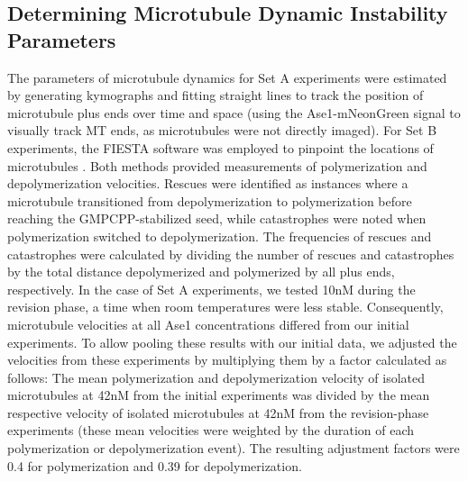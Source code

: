 \subsection{Determining Microtubule Dynamic Instability Parameters}
The parameters of microtubule dynamics for Set A experiments were estimated by generating kymographs and fitting straight lines to track the position of microtubule plus ends over time and space (using the Ase1-mNeonGreen signal to visually track MT ends, as microtubules were not directly imaged). For Set B experiments, the FIESTA software was employed to pinpoint the locations of microtubules \parencite{RUHNOW20112820}. Both methods provided measurements of polymerization and depolymerization velocities. Rescues were identified as instances where a microtubule transitioned from depolymerization to polymerization before reaching the GMPCPP-stabilized seed, while catastrophes were noted when polymerization switched to depolymerization. The frequencies of rescues and catastrophes were calculated by dividing the number of rescues and catastrophes by the total distance depolymerized and polymerized by all plus ends, respectively. In the case of Set A experiments, we tested 10nM during the revision phase, a time when room temperatures were less stable. Consequently, microtubule velocities at all Ase1 concentrations differed from our initial experiments. To allow pooling these results with our initial data, we adjusted the velocities from these experiments by multiplying them by a factor calculated as follows: The mean polymerization and depolymerization velocity of isolated microtubules at 42nM from the initial experiments was divided by the mean respective velocity of isolated microtubules at 42nM from the revision-phase experiments (these mean velocities were weighted by the duration of each polymerization or depolymerization event). The resulting adjustment factors were 0.4 for polymerization and 0.39 for depolymerization.

